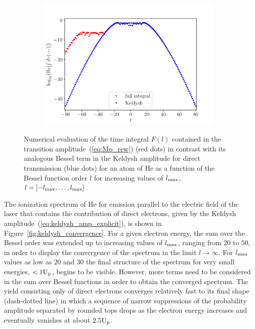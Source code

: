 \begin{figure}
\begin{subfigure}[b]{0.33\linewidth}
  \includegraphics[width=\textwidth]{figures/ch_ATI_SFA/He/l80n512WP50PG25MR35vsKeldysh.pdf}
\end{subfigure}
\caption{Numerical evaluation of the time integral $F(l)$ contained in
  the transition amplitude~(\ref{eq:Mp_rew}) (red dots) in contrast
  with its analogous Bessel term in the Keldysh amplitude for direct
  transmission (blue dots) for an atom of He as a function of the
  Bessel function order $l$ for increasing values of $l_{\rm{max}}$,
  $l=[ -l_{\rm{max}} , \dots, l_{\rm{max}}]$.}
  \label{fig:integral_keldysh}
\end{figure}



The ionization spectrum of He for emission parallel to the electric
field of the laser that contains the contribution of direct electrons,
given by the Keldysh amplitude~(\ref{eq:keldysh_amp_explicit}), is
shown in Figure~\ref{fig:keldysh_convergence}. For a given electron
energy, the sum over the Bessel order was extended up to increasing
values of $l_{\rm{max}}$, ranging from $20$ to $50$, in order to
display the convergence of the spectrum in the limit $l\to\infty$. For
$l_{\rm{max}}$ values as low as $20$ and $30$ the final structure of
the spectrum for very small energies, $<1 \rm{U_{p}}$, begins to be
visible. However, more terms need to be considered in the sum over
Bessel functions in order to obtain the converged spectrum. The yield
consisting only of direct electrons converges relatively fast to its
final shape (dash-dotted line) in which a sequence of narrow
suppressions of the probability amplitude separated by rounded tops
drops as the electron energy increases and eventually vanishes at
about $2.5\rm{U_{p}}$.

